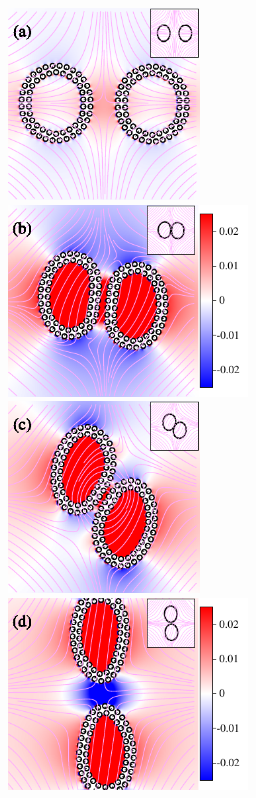 \documentclass[lineno]{jfm}
\begin{document}





\begin{figure}
\centering
\includegraphics[height=2in]{N116_ext_0.pdf}
\includegraphics[height=2in]{N116_ext_2000.pdf}\\
\includegraphics[height=2in]{N116_ext_4000.pdf}
\includegraphics[height=2in]{N116_ext_6500.pdf}

\end{figure}
\end{document}
